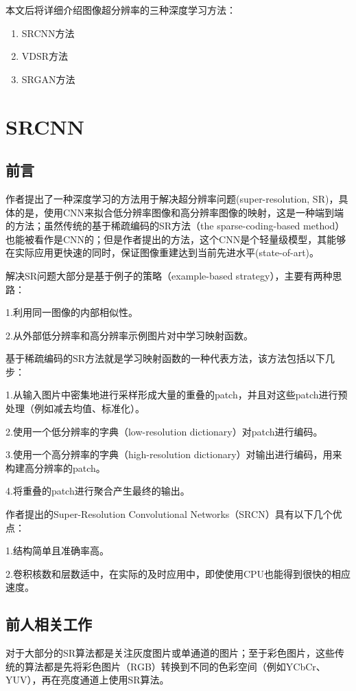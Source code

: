 \documentclass[UTF8,a4paper,10pt]{ctexrep}
\begin{document}
本文后将详细介绍图像超分辨率的三种深度学习方法：
\begin{enumerate}
  \item SRCNN方法
  \item VDSR方法
  \item SRGAN方法
\end{enumerate}

\chapter{SRCNN}
\section{前言}
作者提出了一种深度学习的方法用于解决超分辨率问题(super-resolution, SR)，具体的是，使用CNN来拟合低分辨率图像和高分辨率图像的映射，这是一种端到端的方法；虽然传统的基于稀疏编码的SR方法（the sparse-coding-based method）也能被看作是CNN的；但是作者提出的方法，这个CNN是个轻量级模型，其能够在实际应用更快速的同时，保证图像重建达到当前先进水平(state-of-art)。

解决SR问题大部分是基于例子的策略（example-based strategy），主要有两种思路：

1.利用同一图像的内部相似性。

2.从外部低分辨率和高分辨率示例图片对中学习映射函数。

基于稀疏编码的SR方法就是学习映射函数的一种代表方法，该方法包括以下几步：

1.从输入图片中密集地进行采样形成大量的重叠的patch，并且对这些patch进行预处理（例如减去均值、标准化）。

2.使用一个低分辨率的字典（low-resolution dictionary）对patch进行编码。

3.使用一个高分辨率的字典（high-resolution dictionary）对输出进行编码，用来构建高分辨率的patch。

4.将重叠的patch进行聚合产生最终的输出。

作者提出的Super-Resolution Convolutional Networks（SRCN）具有以下几个优点：

1.结构简单且准确率高。

2.卷积核数和层数适中，在实际的及时应用中，即使使用CPU也能得到很快的相应速度。

\section{前人相关工作}

对于大部分的SR算法都是关注灰度图片或单通道的图片；至于彩色图片，这些传统的算法都是先将彩色图片（RGB）转换到不同的色彩空间（例如YCbCr、YUV），再在亮度通道上使用SR算法。
\end{document}
